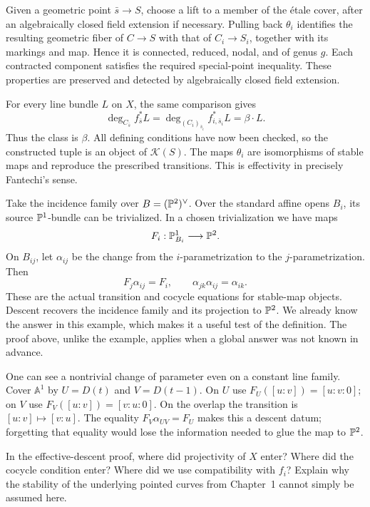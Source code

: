 Given a geometric point $\bar s\to S$, choose a lift to a member of the \'etale cover, after an algebraically closed field extension if necessary. Pulling back $\theta_i$ identifies the resulting geometric fiber of $C\to S$ with that of $C_i\to S_i$, together with its markings and map. Hence it is connected, reduced, nodal, and of genus $g$. Each contracted component satisfies the required special-point inequality. These properties are preserved and detected by algebraically closed field extension.

For every line bundle $L$ on $X$, the same comparison gives
\[
 \deg_{C_{\bar s}}f_{\bar s}^*L
   =\deg_{(C_i)_{\bar s_i}}f_{i,\bar s_i}^*L
   =\beta\cdot L.
\]
Thus the class is $\beta$. All defining conditions have now been checked, so the constructed tuple is an object of $\mathscr K(S)$. The maps $\theta_i$ are isomorphisms of stable maps and reproduce the prescribed transitions. This is effectivity in precisely Fantechi's sense.

\begin{Ex}\label{maps:line-descent}
Take the incidence family over $B=(\mathbb P^2)^\vee$. Over the standard affine opens $B_i$, its source $\mathbb P^1$-bundle can be trivialized. In a chosen trivialization we have maps
\[
 F_i:\mathbb P^1_{B_i}\longrightarrow\mathbb P^2.
\]
On $B_{ij}$, let $\alpha_{ij}$ be the change from the $i$-parametrization to the $j$-parametrization. Then
\[
 F_j\alpha_{ij}=F_i,\qquad \alpha_{jk}\alpha_{ij}=\alpha_{ik}.
\]
These are the actual transition and cocycle equations for stable-map objects. Descent recovers the incidence family and its projection to $\mathbb P^2$. We already know the answer in this example, which makes it a useful test of the definition. The proof above, unlike the example, applies when a global answer was not known in advance.

One can see a nontrivial change of parameter even on a constant line family. Cover $\mathbb A^1$ by $U=D(t)$ and $V=D(t-1)$. On $U$ use $F_U([u:v])=[u:v:0]$; on $V$ use $F_V([u:v])=[v:u:0]$. On the overlap the transition is $[u:v]\mapsto[v:u]$. The equality $F_V\alpha_{UV}=F_U$ makes this a descent datum; forgetting that equality would lose the information needed to glue the map to $\mathbb P^2$.
\end{Ex}

\begin{Ej}\label{maps:ex-descent}
In the effective-descent proof, where did projectivity of $X$ enter? Where did the cocycle condition enter? Where did we use compatibility with $f_i$? Explain why the stability of the underlying pointed curves from Chapter~1 cannot simply be assumed here.
\end{Ej}

